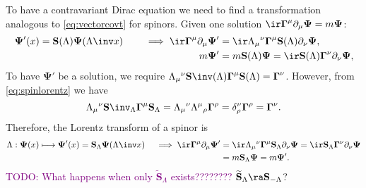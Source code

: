 \documentclass[11pt]{article}
\newcommand{\todo}[1]{\textcolor{purple}{TODO: #1}}
\newcommand{\Gammab}{\boldsymbol{\Gamma}}
\renewcommand{\S}{\mathbf{S}}
\newcommand{\St}{\widetilde{\S}}
\newcommand{\Psib}{\boldsymbol{\Psi}}
\begin{document}
To have a contravariant Dirac equation we need to find a transformation analogous to \cref{eq:vectorcovt} for spinors.
Given one solution \(\ir \Gammab^\mu \partial_\mu \Psib = m \Psib\):
%
\begin{equation*}
\begin{aligned}
  \Psib'(x) = \S(\Lambda) \Psib(\Lambda\inv x)
  \qquad\implies
  \ir \Gammab^\mu \partial_\mu \Psib'
    &= \ir \Lambda_\mu{}^\nu \Gammab^\mu \S(\Lambda) \partial_\nu \Psib, \\
  m \Psib' &= m \S(\Lambda) \Psib
    = \ir \S(\Lambda) \Gammab^\nu \partial_\nu \Psib,
\end{aligned}
\end{equation*}
%
To have \(\Psib'\) be a solution, we require \(\Lambda_\mu{}^\nu \S\inv(\Lambda) \Gammab^\mu \S(\Lambda) = \Gammab^\nu\).
However, from \cref{eq:spinlorentz} we have
%
\begin{equation*}
  \Lambda_\mu{}^\nu \S\inv_\Lambda \Gammab^\mu \S_\Lambda 
    = \Lambda_\mu{}^\nu \Lambda^\mu{}_\rho \Gammab^\rho
    = \delta^\nu_\rho \Gammab^\rho 
    = \Gammab^\nu.
\end{equation*}
%
Therefore, the Lorentz transform of a spinor is
%
\begin{equation}\label{eq:diraccovt}
\begin{aligned}
  \Lambda: \Psib(x) \longmapsto \Psib'(x) = \S_\Lambda \Psib(\Lambda\inv x)
  \quad \implies
  \ir \Gammab^\mu \partial_\mu \Psib'
    &= \ir \Lambda_\mu{}^\nu \Gammab^\mu \S_\Lambda \partial_\nu \Psib
    = \ir \S_\Lambda \Gammab^\nu \partial_\nu \Psib \\
    &= m \S_\Lambda \Psib
    = m \Psib'.
\end{aligned}
\end{equation}
%
\todo{What happens when only \(\St_\Lambda\) exists????????} \(\St_\Lambda \ra \S_{-\Lambda}\)?
\end{document}
